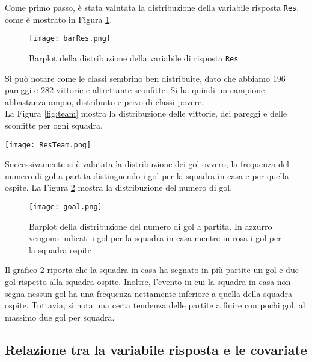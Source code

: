Come primo passo, è stata valutata la distribuzione della variabile risposta \texttt{Res}, come è mostrato in Figura \ref{fig:res}.
\begin{figure}[htbp]
	\begin{center}
		\texttt{[image: barRes.png]}
		\caption{Barplot della distribuzione della variabile di risposta \texttt{Res}} \label{fig:res}
	\end{center}
\end{figure}
Si può notare come le classi sembrino ben distribuite, dato che abbiamo 196 pareggi e 282 vittorie e altrettante sconfitte. Si ha quindi un campione abbastanza ampio, distribuito e privo di classi povere.\\
La Figura \ref{fig:team} mostra la distribuzione delle vittorie, dei pareggi e delle sconfitte per ogni squadra. 

\begin{sidewaysfigure} 
	\centering
	\begin{center}
		\texttt{[image: ResTeam.png]}
		\caption{Barplot della distribuzione della variabile di risposta per squadra\texttt{Res}} \label{fig:team}
	\end{center}
\end{sidewaysfigure} 

Successivamente si è valutata la distribuzione dei gol ovvero, la frequenza del numero di gol a partita distinguendo i gol per la squadra in casa e per quella ospite. La Figura \ref{fig:goal} mostra la distribuzione del numero di gol.
\begin{figure}[htbp]
	\begin{center}
		\texttt{[image: goal.png]}
		\caption{Barplot della distribuzione del numero di gol a partita. In azzurro vengono indicati i gol per la squadra in casa mentre in rosa i gol per la squadra ospite} \label{fig:goal}
	\end{center}
\end{figure}
Il grafico \ref{fig:goal} riporta che la squadra in casa ha segnato in più partite un gol e due gol rispetto alla squadra ospite. Inoltre, l'evento in cui la squadra in casa non segna nessun gol ha una frequenza nettamente inferiore a quella della squadra ospite. Tuttavia, si nota una certa tendenza delle partite a finire con pochi gol, al massimo due gol per squadra.
\subsection{Relazione tra la variabile risposta e le covariate}

